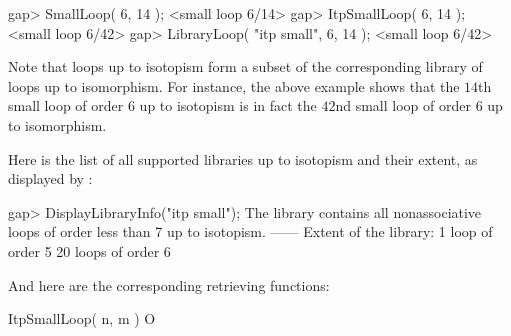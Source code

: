\beginexample
gap> SmallLoop( 6, 14 );
<small loop 6/14>
gap> ItpSmallLoop( 6, 14 );
<small loop 6/42>
gap> LibraryLoop( "itp small", 6, 14 );
<small loop 6/42>
\endexample

Note that loops up to isotopism form a subset of the corresponding library of
loops up to isomorphism. For instance, the above example shows that the $14$th
small loop of order $6$ up to isotopism is in fact the $42$nd small loop of
order $6$ up to isomorphism.

Here is the list of all supported libraries up to isotopism and their extent,
as displayed by \LOOPS:

\beginexample
gap> DisplayLibraryInfo("itp small");
The library contains all nonassociative loops of order less than 7 up to
isotopism.
------
Extent of the library:
   1 loop of order 5
   20 loops of order 6
\endexample

And here are the corresponding retrieving functions:

\>ItpSmallLoop( n, m ) O
